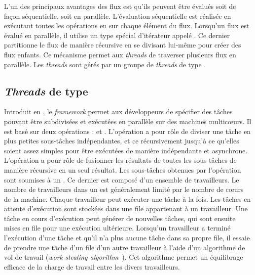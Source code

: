 L'un des principaux avantages des flux est qu'ils peuvent \^etre \'evalu\'es soit de fa\c{c}on s\'equentielle, soit en parall\`ele. L'\'evaluation s\'equentielle est r\'ealis\'ee en ex\'ecutant toutes les op\'erations en  sur chaque \'el\'ement du flux. Lorsqu'un flux est \'evalu\'e en parall\`ele, il utilise un type sp\'ecial d'it\'erateur appel\'e . Ce dernier partitionne le flux de mani\`ere r\'ecursive en se divisant lui-m\^eme pour cr\'eer des flux enfants. Ce m\'ecanisme permet aux \emph{threads} de traverser plusieurs flux en parall\`ele. Les \emph{threads} sont g\'er\'es par un groupe de \emph{threads} de type .


\subsection{\emph{Threads} de type }
\label{forkjoin.sect}

Introduit en , le \emph{framework}  permet aux d\'eveloppeurs de sp\'ecifier des t\^aches pouvant \^etre subdivis\'ees et ex\'ecut\'ees en parall\`ele sur des machines multicœurs. Il est bas\'e sur deux op\'erations :  et . L'op\'eration  a pour r\^ole de diviser une t\^ache en plus petites sous-t\^aches ind\'ependantes, et ce  r\'ecursivement jusqu'\`a ce qu'elles soient assez simples pour \^etre ex\'ecut\'ees de mani\`ere ind\'ependante et asynchrone. L'op\'eration  a pour r\^ole de fusionner les r\'esultats de toutes les sous-t\^aches de mani\`ere r\'ecursive en un seul r\'esultat.
Les sous-t\^aches obtenues par l'op\'eration  sont soumises \`a un . Ce dernier est composé d'un ensemble de travailleurs. Le nombre de travailleurs dans un  est g\'en\'eralement limit\'e par le nombre de cœurs de la machine. Chaque travailleur peut ex\'ecuter une t\^ache \`a la fois. Les t\^aches en attente d'ex\'ecution sont stock\'ees dans une file appartenant \`a un travailleur. Une t\^ache en cours d'ex\'ecution peut g\'en\'erer de nouvelles t\^aches, qui sont ensuite mises en file  pour une ex\'ecution ult\'erieure. Lorsqu'un travailleur a termin\'e l'ex\'ecution d'une t\^ache et qu'il n'a plus aucune t\^ache dans sa propre file, il essaie de prendre une t\^ache d'un file d'un autre travailleur \`a l'aide d'un algorithme de vol de travail (\emph{work stealing algorithm}~\citep{FrigoLeiRan98}). Cet algorithme permet un \'equilibrage efficace de la charge de travail entre les divers travailleurs.


